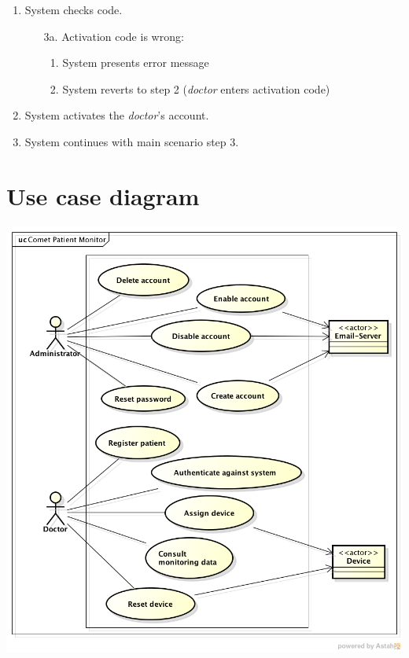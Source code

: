 \documentclass[fontsize=12pt,
               paper=a4,
               twoside=false,
               parskip=half,
               ]{scrartcl}
\begin{document}
\begin{itemize}[leftmargin=3em]
\begin{enumerate}
\begin{itemize}
\begin{enumerate}[label=\arabic*.]
			\end{enumerate}
		\end{itemize}
		\item System checks code.
		\begin{itemize}
			\item[3a.] Activation code is wrong:
			\begin{enumerate}[label=\arabic*.]
				\item System presents error message
				\item System reverts to step 2 (\emph{doctor} enters activation code)
			\end{enumerate}
		\end{itemize}
		\item System activates the \emph{doctor}'s account.
		\item System continues with main scenario step 3.
	\end{enumerate}
\end{itemize}

\section{Use case diagram}


\includegraphics[width=15cm]{./use-case-diagram.png}
\end{document}
